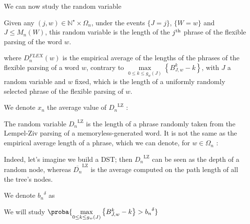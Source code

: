 \noindent
We can now study the random variable

\noindent
Given any $(j,w) \in \mathbb{N}^{\star} \times \Omega_n$,
under the events $\{ J = j \}$, $\{ W = w \}$ and $J \leq M_n(W)$, 
this random variable is the length of 
the $j^{\textmd{th}}$ phrase of the flexible parsing of the word $w$.

\noindent
where $D_n^{FLEX}(w)$ is the empirical average of the lengths of the phrases
of the flexible parsing of a word $w$, contrary to
        $\underset{ 0 \leq k \leq g_w(J) }{ \max } 
        \left\{ { B_{J, w}^k - k } \right\} $,
with $J$ a random variable and $w$ fixed,
which is the length of a uniformly randomly selected 
phrase of the flexible parsing of $w$. 

\begin{df}
    We denote $x_n$ the average value of ${D_n}^{\text{LZ}}$ :
\end{df}

\begin{rmk}
    The random variable ${D_n}^{\text{LZ}}$ is the
    length of a phrase randomly taken from the 
    Lempel-Ziv parsing 
    of a memoryless-generated word. It is not the same as
    the empirical average length of a phrase, which we can
    denote,
    for $w \in \Omega_n$ :

    \noindent
    Indeed, let's imagine we build a DST; then ${D_n}^{\text{LZ}}$
    can be seen as the depth of a random node, whereas 
    $\overline{D_n}^{\text{LZ}}$ is the average computed on the path
    length of all the tree's nodes.
\end{rmk}

\begin{nota}
    We denote ${b_n}^{\delta}$ as
\end{nota}

\noindent
We will study
    \centers
    {$ \proba{ 
        \underset{ 0 \leq k \leq g_w(J) }{ \max } 
        \left\{ { B_{J, w}^k - k } \right\}
            > {b_n}^{\delta} } $}